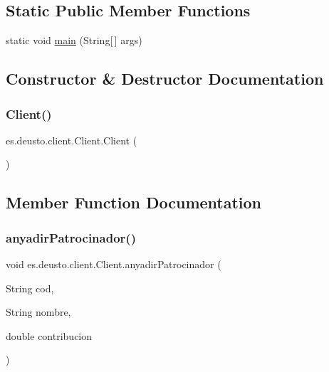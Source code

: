 \subsection*{Static Public Member Functions}
\begin{DoxyCompactItemize}
\item 
static void \mbox{\hyperlink{classes_1_1deusto_1_1client_1_1_client_a69a7526d0af9cb2341f4bf341b501152}{main}} (String\mbox{[}$\,$\mbox{]} args)
\end{DoxyCompactItemize}


\subsection{Constructor \& Destructor Documentation}
\mbox{\label{classes_1_1deusto_1_1client_1_1_client_a71c03e318a72447da873297f3364f67f}} 
\subsubsection{\texorpdfstring{Client()}{Client()}}
{\footnotesize\ttfamily es.\+deusto.\+client.\+Client.\+Client (\begin{DoxyParamCaption}{ }\end{DoxyParamCaption})}



\subsection{Member Function Documentation}
\mbox{\label{classes_1_1deusto_1_1client_1_1_client_a7023d196eb023c279e693048e53e2116}} 
\subsubsection{\texorpdfstring{anyadirPatrocinador()}{anyadirPatrocinador()}}
{\footnotesize\ttfamily void es.\+deusto.\+client.\+Client.\+anyadir\+Patrocinador (\begin{DoxyParamCaption}\item[{String}]{cod,  }\item[{String}]{nombre,  }\item[{double}]{contribucion }\end{DoxyParamCaption})}

